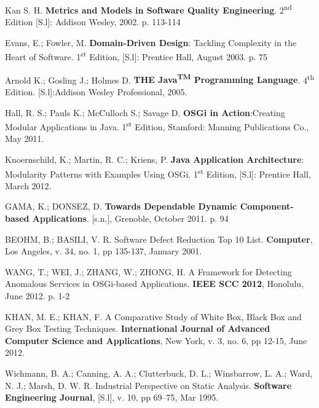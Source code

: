 \documentclass[cic,tc,english]{iiufrgs} %
\newcommand{\ts}{\textsuperscript}
\begin{document}
\begin{thebibliography}{este-parametro-nao-eh-usado-pelo-estilo-ABNT}

 Kan S. H.
\textbf{Metrics and Models in Software Quality Engineering}. 2\ts{nd} Edition [S.l]: Addison Wesley, 2002. p. 113-114

 Evans, E.; Fowler, M.
\textbf{Domain-Driven Design}: Tackling Complexity in the Heart of Software. 1\ts{st} Edition, [S.l]: Prentice Hall, August 2003. p. 75 

 Arnold K.; Gosling J.; Holmes D.
\textbf{THE Java\ts{TM} Programming Language}. 4\ts{th} Edition. [S.l]:Addison Wesley Professional, 2005.

 Hall, R. S.; Pauls K.; McCulloch S.; Savage D.
\textbf{OSGi in Action}:Creating Modular Applications in Java. 1\ts{st} Edition, Stamford: Manning Publications Co., May 2011.

 Knoernschild, K.; Martin, R. C.; Kriens, P. 
\textbf{Java Application Architecture}:  Modularity Patterns with Examples Using OSGi. 1\ts{st} Edition, [S.l]: Prentice Hall, March 2012. 



 GAMA, K.; DONSEZ, D.
\textbf{Towards Dependable Dynamic Component-based Applications}. [s.n.], Grenoble, October 2011. p. 94

 BEOHM, B.; BASILI, V. R.
Software Defect Reduction Top 10 List. \textbf{Computer}, Los Angeles, v. 34, no. 1, pp 135-137, January 2001.

 WANG, T.; WEI, J.; ZHANG, W.; ZHONG, H.
A Framework for Detecting Anomalous Services in OSGi-based Applications. \textbf{IEEE SCC 2012}, Honolulu, June 2012. p. 1-2

 KHAN, M. E.; KHAN, F.
A Comparative Study of White Box, Black Box and Grey Box Testing Techniques. \textbf{International Journal of Advanced Computer Science and Applications}, New York, v. 3, no. 6, pp 12-15, June 2012.

Wichmann, B. A.; Canning, A. A.; Clutterbuck, D. L.; Winsbarrow, L. A.; Ward, N. J.; Marsh, D. W. R.
Industrial Perspective on Static Analysis. \textbf{Software Engineering Journal}, [S.l], v. 10, pp 69–75, Mar 1995.


\end{thebibliography}
\end{document}
